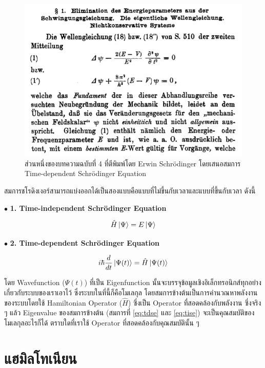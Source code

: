\begin{figure}[htbp]
    \centering
    \includegraphics[width=0.8\linewidth]{fig/time-dep-schrodinger-eq.png}
    \caption{ส่วนหนึ่งของบทความฉบับที่ 4 ที่ตีพิมพ์โดย Erwin Schr\"{o}dinger โดยเสนอสมการ Time-dependent Schr\"{o}dinger 
    Equation}
    \label{fig:schrodinger_paper_4}
\end{figure}

สมการชโรดิงเงอร์สามารถแบ่งออกได้เป็นสองแบบคือแบบที่ไม่ขึ้นกับเวลาและแบบที่ขึ้นกับเวลา ดังนี้

\noindent $\bullet$ \textbf{1. Time-independent Schr\"{o}dinger Equation}

\begin{equation}\label{eq:tise}
    \hat{H}\ket{\Psi} = E \ket{\Psi}
\end{equation}

\noindent $\bullet$ \textbf{2. Time-dependent Schr\"{o}dinger Equation}

\begin{equation}\label{eq:tdse}
    i \hbar \frac{d}{d t} \ket{\Psi(t)} = \hat{H} \ket{\Psi(t)}
\end{equation}

โดย Wavefunction ($\Psi(t)$) ที่เป็น Eigenfunction นั้นจะบรรจุข้อมูลเชิงอิเล็กทรอนิกส์ทุกอย่างเกี่ยวกับระบบของเราเอาไว้%
\autocite{szabo1996,cramer2004,jensen2017} ซึ่งระบบในที่นี้ก็คือโมเลกุล โดยสมการข้างต้นเป็นการคำนวณหาพลังงานของระบบโดยใช้ 
Hamiltonian Operator ($\hat{H}$) ซึ่งเป็น Operator ที่สอดคล้องกับพลังงาน ซึ่งจริง ๆ แล้ว Eigenvalue ของสมการข้างต้น (สมการที่ 
\ref{eq:tdse} และ \ref{eq:tise}) จะเป็นคุณสมบัติของโมเลกุลอะไรก็ได้ ตราบใดที่เราใช้ Operator ที่สอดคล้องกับคุณสมบัตินั้น ๆ 

\section{แฮมิลโทเนียน}
\label{sec:hamiltonian}

